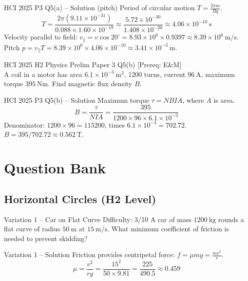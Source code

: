 \documentclass[11pt]{beamer}
\begin{document}
\begin{frame}[shrink=15]{HCI 2025 P3 Q5(a) – Solution (pitch)}
Period of circular motion $T = \frac{2\pi m}{Bq}$.
\[ T = \frac{2\pi (9.11\times10^{-31})}{0.088 \times 1.60\times10^{-19}} \approx \frac{5.72\times10^{-30}}{1.408\times10^{-20}} \approx 4.06\times10^{-10}\ \mathrm{s} \]
Velocity parallel to field: $v_\parallel = v\cos20^\circ = 8.93\times10^{6}\times0.9397 \approx 8.39\times10^{6}\ \mathrm{m/s}$.
Pitch $p = v_\parallel T = 8.39\times10^{6}\times4.06\times10^{-10} \approx 3.41\times10^{-3}\ \mathrm{m}$.
\end{frame}

\begin{frame}[shrink=15]{HCI 2025 H2 Physics Prelim Paper 3 Q5(b)}
[Prereq: E\&M]\\
A coil in a motor has area $6.1\times10^{-3}\ \mathrm{m^2}$, 1200 turns, current $96\ \mathrm{A}$, maximum torque $395\ \mathrm{Nm}$. Find magnetic flux density $B$.
\end{frame}

\begin{frame}{HCI 2025 P3 Q5(b) – Solution}
Maximum torque $\tau = NBIA$, where $A$ is area.
\[ B = \frac{\tau}{N I A} = \frac{395}{1200\times96\times6.1\times10^{-3}} \]
Denominator: $1200\times96 = 115200$, times $6.1\times10^{-3} = 702.72$.
$B = 395 / 702.72 \approx 0.562\ \mathrm{T}$.
\end{frame}

\section{Question Bank}

\subsection{Horizontal Circles (H2 Level)}

\begin{frame}[shrink=15]{Variation 1 – Car on Flat Curve \hfill Difficulty: 3/10}
A car of mass $1200\ \mathrm{kg}$ rounds a flat curve of radius $50\ \mathrm{m}$ at $15\ \mathrm{m/s}$. What minimum coefficient of friction is needed to prevent skidding?
\end{frame}

\begin{frame}{Variation 1 – Solution}
Friction provides centripetal force: $f = \mu mg = \frac{mv^2}{r}$.
\[ \mu = \frac{v^2}{rg} = \frac{15^2}{50\times9.81} = \frac{225}{490.5} \approx 0.459 \]
\end{frame}
\end{document}
